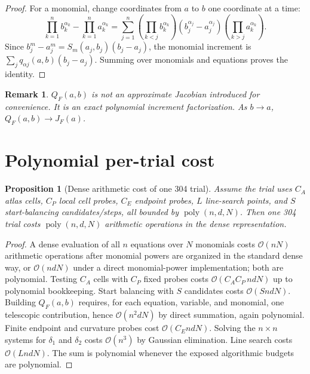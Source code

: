 \documentclass[11pt]{article}
\newtheorem{proposition}[definition]{Proposition}
\newtheorem{remark}[definition]{Remark}
\newcommand{\OO}{\mathcal O}
\newcommand{\poly}{\operatorname{poly}}
\begin{document}
\begin{proof}
For a monomial, change coordinates from $a$ to $b$ one coordinate at a time:
\[
\prod_{k=1}^n b_k^{\alpha_k}-\prod_{k=1}^n a_k^{\alpha_k}
=\sum_{j=1}^n
\left(\prod_{k<j}b_k^{\alpha_k}\right)
\left(b_j^{\alpha_j}-a_j^{\alpha_j}\right)
\left(\prod_{k>j}a_k^{\alpha_k}\right).
\]
Since $b_j^m-a_j^m=S_m(a_j,b_j)(b_j-a_j)$, the monomial increment is $\sum_jq_{\alpha j}(a,b)(b_j-a_j)$.  Summing over monomials and equations proves the identity.
\end{proof}

\begin{remark}
$Q_F(a,b)$ is not an approximate Jacobian introduced for convenience.  It is an exact polynomial increment factorization.  As $b\to a$, $Q_F(a,b)\to J_F(a)$.
\end{remark}

\section{Polynomial per-trial cost}

\begin{proposition}[Dense arithmetic cost of one 304 trial]\label{prop:cost}
Assume the trial uses $C_A$ atlas cells, $C_P$ local cell probes, $C_E$ endpoint probes, $L$ line-search points, and $S$ start-balancing candidates/steps, all bounded by $\poly(n,d,N)$.  Then one 304 trial costs $\poly(n,d,N)$ arithmetic operations in the dense representation.
\end{proposition}

\begin{proof}
A dense evaluation of all $n$ equations over $N$ monomials costs $\OO(nN)$ arithmetic operations after monomial powers are organized in the standard dense way, or $\OO(ndN)$ under a direct monomial-power implementation; both are polynomial.  Testing $C_A$ cells with $C_P$ fixed probes costs $\OO(C_AC_P\,ndN)$ up to polynomial bookkeeping.  Start balancing with $S$ candidates costs $\OO(SndN)$.  Building $Q_F(a,b)$ requires, for each equation, variable, and monomial, one telescopic contribution, hence $\OO(n^2dN)$ by direct summation, again polynomial.  Finite endpoint and curvature probes cost $\OO(C_EndN)$.  Solving the $n\times n$ systems for $\delta_1$ and $\delta_2$ costs $\OO(n^3)$ by Gaussian elimination.  Line search costs $\OO(LndN)$.  The sum is polynomial whenever the exposed algorithmic budgets are polynomial.
\end{proof}
\end{document}
